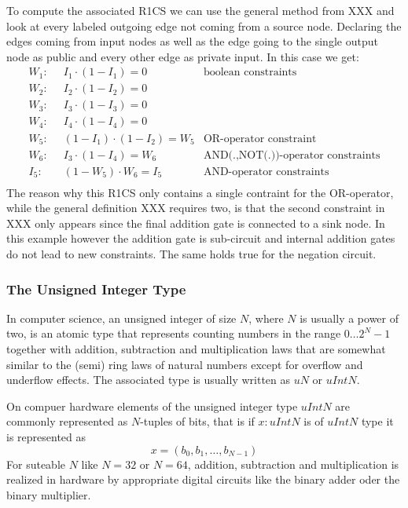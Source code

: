 \begin{example}
To compute the associated R1CS we can use the general method from XXX and look at every labeled outgoing edge not coming from a source node. Declaring the edges coming from input nodes as well as the edge going to the single output node as public and every other edge as private input. In this case we get:
\begin{align*}
W_1:\;\; & I_1 \cdot (1- I_1) = 0  & \text{boolean constraints}\\
W_2:\;\; & I_2 \cdot (1- I_2) = 0 \\
W_3:\;\; & I_3 \cdot (1- I_3) = 0 \\
W_4:\;\; & I_4 \cdot (1- I_4) = 0 \\
W_5:\;\; & (1- I_1)\cdot (1-I_2) = W_5 & \text{OR-operator constraint}\\
W_6:\;\; & I_3 \cdot (1-I_4) = W_6 & \text{AND(.,NOT(.))-operator constraints}\\
I_5:\;\; & (1-W_5) \cdot W_6 = I_5 & \text{AND-operator constraints}\\
\end{align*}
The reason why this R1CS only contains a single contraint for the OR-operator, while the general definition XXX requires two, is that the second constraint in XXX only appears since the final addition gate is connected to a sink node. In this example however the addition gate is sub-circuit and internal addition gates do not lead to new constraints. The same holds true for the negation circuit. 
\end{example}
\subsubsection{The Unsigned Integer Type} In computer science, an unsigned integer of size $N$, where $N$ is usually a power of two, is an atomic type that represents counting numbers in the range $0\ldots 2^N-1$ together with addition, subtraction and multiplication laws that are somewhat similar to the (semi) ring laws of natural numbers except for overflow and underflow effects. The associated type is usually written as $uN$ or $uIntN$.

On compuer hardware elements of the unsigned integer type $uIntN$ are commonly represented as $N$-tuples of bits, that is if $x : uIntN$ is of $uIntN$ type it is represented as
$$
x = (b_0,b_1,\ldots, b_{N-1})
$$
For suteable $N$ like $N=32$ or $N=64$, addition, subtraction and multiplication is realized in hardware by appropriate digital circuits like the binary adder oder the binary multiplier. 

